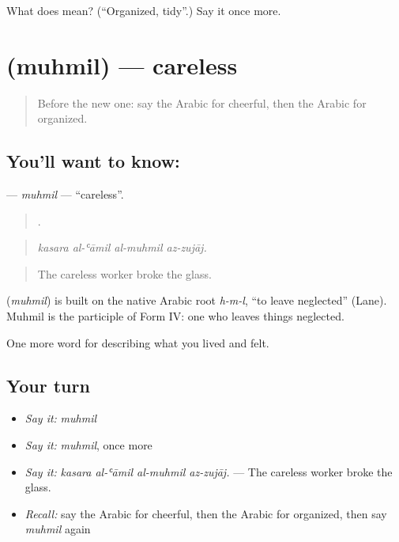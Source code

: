 \begin{tcolorbox}[breakable,colback=teal!4,colframe=teal!35!black,title={Before you move on}]
What does  mean? (\textquotedblleft{}Organized, tidy\textquotedblright{}.) Say it once more.
\end{tcolorbox}
\section[\texorpdfstring{\ar{مهمل} (muhmil)}{مهمل (muhmil)}]{ (muhmil) — careless}

\label{lesson:AR-C503-muhmil}



\begin{quote}
Before the new one: say the Arabic for cheerful, then the Arabic for organized.
\end{quote}

\subsection*{You'll want to know: }
\textbf{} — \emph{muhmil} — \textquotedblleft{}careless\textquotedblright{}.

\begin{quote}
   .
\end{quote}

\begin{quote}
\emph{kasara al-ʿāmil al-muhmil az-zujāj.}
\end{quote}

\begin{quote}
The careless worker broke the glass.
\end{quote}

\begin{cousinweb}
\textbf{} (\emph{muhmil}) is built on the native Arabic root \emph{h-m-l}, \textquotedblleft{}to leave neglected\textquotedblright{} (Lane). Muhmil is the participle of Form IV: one who leaves things neglected.
\end{cousinweb}

\begin{grammarlens}[title={What you've built}]
One more word for describing what you lived and felt.
\end{grammarlens}

\subsection*{Your turn}
\begin{itemize}
\raggedright
  \item \emph{Say it:} \emph{muhmil}
  \item \emph{Say it:} \emph{muhmil}, once more
  \item \emph{Say it:} \emph{kasara al-ʿāmil al-muhmil az-zujāj.} — The careless worker broke the glass.
  \item \emph{Recall:} say the Arabic for cheerful, then the Arabic for organized, then say \emph{muhmil} again
\end{itemize}

